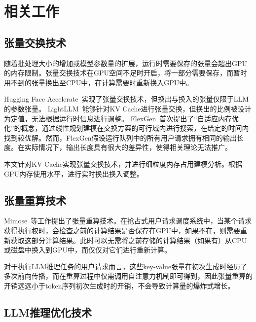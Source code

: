 \section{相关工作}

\subsection{张量交换技术}

随着批处理大小的增加或模型参数量的扩展，运行时需要保存的张量会超出GPU的内存限制。张量交换技术在GPU空间不足时开启，将一部分需要保存，而暂时用不到的张量换出至CPU中，在计算需要时重新换入GPU中。

Hugging Face Accelerate~\cite{Huggingface-Accelerate}实现了张量交换技术，但换出与换入的张量仅限于LLM的参数张量。
LightLLM~\cite{LightLLM}能够针对KV Cache进行张量交换，但换出的比例被设计为定值，无法根据运行时信息进行调整。
FlexGen~\cite{Swapping}首次提出了“自适应内存优化”的概念，通过线性规划建模在交换方案的可行域内进行搜索，在给定的时间内找到较优解。然而，FlexGen假设运行队列中的所有用户请求拥有相同的输出长度。在实际情况下，输出长度具有很大的差异性，使得相关理论无法推广。

本文针对KV Cache实现张量交换技术，并进行细粒度内存占用建模分析。根据GPU内存使用水平，进行实时换出换入调整。

\subsection{张量重算技术}

Mimose~\cite{Recomputation, Recomp_2, Recomp_3}等工作提出了张量重算技术。在抢占式用户请求调度系统中，当某个请求获得执行权时，会检查之前的计算结果是否保存在GPU中，如果不在，则需要重新获取这部分计算结果。此时可以无需将之前存储的计算结果（如果有）从CPU或磁盘中换入到GPU中，而仅仅对它们进行重新计算。

对于执行LLM推理任务的用户请求而言，这些key-value张量在初次生成时经历了多次前向传播，而在重算过程中仅需调用自注意力机制即可得到，因此张量重算的开销远远小于token序列初次生成时的开销，不会导致计算量的爆炸式增长。

\subsection{LLM推理优化技术}

